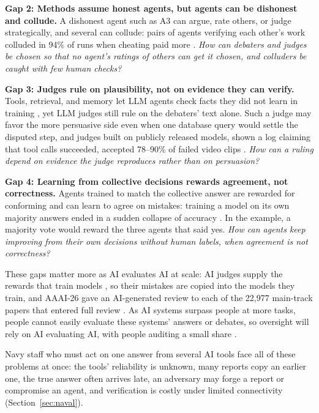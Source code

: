 \documentclass[12pt,letterpaper]{article}
\begin{document}
\textbf{Gap 2: Methods assume honest agents, but agents can be dishonest and collude.} A dishonest agent such as A3 can argue, rate others, or judge strategically, and several can collude: pairs of agents verifying each other's work colluded in 94\% of runs when cheating paid more \citep{shi2026collusion}. \emph{How can debaters and judges be chosen so that no agent's ratings of others can get it chosen, and colluders be caught with few human checks?}

\textbf{Gap 3: Judges rule on plausibility, not on evidence they can verify.} Tools, retrieval, and memory let LLM agents check facts they did not learn in training \citep{mialon2023augmented}, yet LLM judges still rule on the debaters' text alone. Such a judge may favor the more persuasive side even when one database query would settle the disputed step, and judges built on publicly released models, shown a log claiming that tool calls succeeded, accepted 78--90\% of failed video clips \citep{xu2026log}. \emph{How can a ruling depend on evidence the judge reproduces rather than on persuasion?}

\textbf{Gap 4: Learning from collective decisions rewards agreement, not correctness.} Agents trained to match the collective answer are rewarded for conforming and can learn to agree on mistakes: training a model on its own majority answers ended in a sudden collapse of accuracy \citep{shafayat2025selftrain}. In the example, a majority vote would reward the three agents that said yes. \emph{How can agents keep improving from their own decisions without human labels, when agreement is not correctness?}

\label{sec:matters}These gaps matter more as AI evaluates AI at scale: AI judges supply the rewards that train models \citep{bai2022constitutional,lee2024rlaif}, so their mistakes are copied into the models they train, and AAAI-26 gave an AI-generated review to each of the 22,977 main-track papers that entered full review \citep{biswas2026aaai}. As AI systems surpass people at more tasks, people cannot easily evaluate these systems' answers or debates, so oversight will rely on AI evaluating AI, with people auditing a small share \citep{bowman2022measuring,burns2024weak}.

Navy staff who must act on one answer from several AI tools face all of these problems at once: the tools' reliability is unknown, many reports copy an earlier one, the true answer often arrives late, an adversary may forge a report or compromise an agent, and verification is costly under limited connectivity (Section~\ref{sec:naval}).
\end{document}
